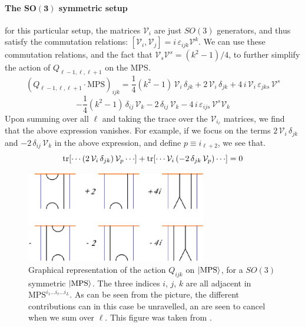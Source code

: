 \paragraph[The $SO(3)$ symmetric setup]{The $\mathbf{SO(3)}$ symmetric setup}
for this particular setup, the matrices $\mathcal{V}_i$ are just $SO(3)$ generators, and thus satisfy the commutation relations: $[\mathcal{V}_i, \mathcal{V}_j] = i \, \varepsilon_{ijk} \mathcal{V}^k$. We can use these commutation relations, and the fact that $\mathcal{V}_s \mathcal{V}^s = (k^2 - 1) / 4$, to further simplify the action of $Q_{\ell-1,\ell,\ell+1}$ on the MPS.
%
%
\begin{equation*}
(Q_{\ell-1,\ell,\ell+1} \cdot \text{MPS})_{ijk}
=
\frac{1}{4} \left(k^2 - 1 \right) \, \mathcal{V}_i \, \delta_{jk}
+
2 \, \mathcal{V}_i \, \delta_{jk}
+
4 \, i \, \mathcal{V}_i \, \varepsilon_{jks} \, \mathcal{V}^s
\end{equation*}
%
%
\begin{equation}
-
\frac{1}{4} \left(k^2 - 1 \right) \, \delta_{ij} \, \mathcal{V}_k
-
2 \, \delta_{ij} \, \mathcal{V}_k
-
4 \, i \, \varepsilon_{ijs} \, \mathcal{V}^s \mathcal{V}_k
\end{equation}
%
%
Upon summing over all $\ell$ and taking the trace over the $\mathcal{V}_{i_\ell}$ matrices, we find that the above expression vanishes. For example, if we focus on the terms $2 \, \mathcal{V}_i \, \delta_{jk}$ and $-2 \, \delta_{ij} \, \mathcal{V}_k$ in the above expression, and define $p \equiv i_{\ell+2}$, we see that.
%
%
\begin{equation}
\tr[ \cdots (2 \, \mathcal{V}_i \, \delta_{jk}) \, \mathcal{V}_p \cdots ]
+
\tr[ \cdots \mathcal{V}_i \, (-2 \, \delta_{jk} \, \mathcal{V}_p) \cdots ]
=
0
\end{equation}
%
%
\begin{figure}
%
\begin{center}
%
\includegraphics[width=0.7\textwidth]{../pics/Q3_on_MPS_SO(3).png}
%
\caption[Graphical representation of the action $Q_{ijk}$ on a $SO(3)$ sym. $\ket{\text{MPS}}$]{Graphical representation of the action $Q_{ijk}$ on $\ket{\text{MPS}}$, for a $SO(3)$ symmetric $\ket{\text{MPS}}$. The three indices $i$, $j$, $k$ are  all adjacent in $\text{MPS}^{i_1 \ldots i_{\ell} \ldots i_L}$. As can be seen from the picture, the different contributions can in this case be unravelled, an are seen to cancel when we sum over $\ell$. This figure was taken from \cite{MPS bethe state overlap}.}
%
\label{fig:Q3_on_MPS_simplified}
%
\end{center}
%
\end{figure}
